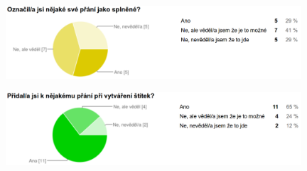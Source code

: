 \begin{figure}[H]
\begin{center}
\includegraphics[width=110mm]{./pictures/dotaznik/jedno-prani-05.png}
\label{fig:dot:jedno-prani-05}
\end{center}
\end{figure}

\begin{figure}[H]
\begin{center}
\includegraphics[width=110mm]{./pictures/dotaznik/jedno-prani-06.png}
\label{fig:dot:jedno-prani-06}
\end{center}
\end{figure}